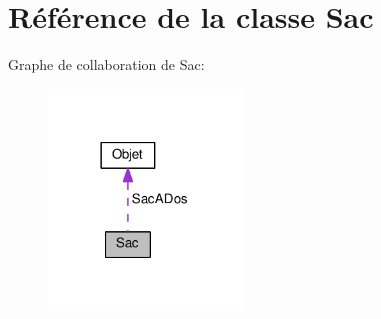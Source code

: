 \hypertarget{class_sac}{}\section{Référence de la classe Sac}
\label{class_sac}


Graphe de collaboration de Sac\+:\nopagebreak
\begin{figure}[H]
\begin{center}
\leavevmode
\includegraphics[width=146pt]{class_sac__coll__graph}
\end{center}
\end{figure}
